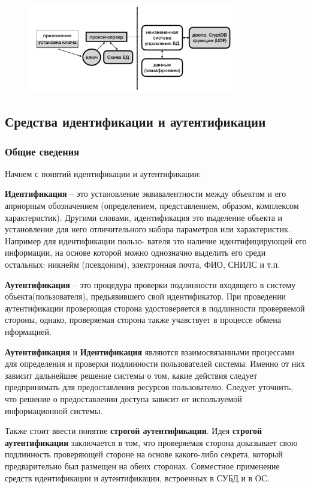 \begin{figure}[h]
    \centering
    \includegraphics[width=0.8\textwidth]{assets/CryptDB.png}
\end{figure}


\subsection{Средства идентификации и аутентификации}
\subsubsection{Общие сведения}
Начнем с понятий идентификации и аутентификации:

\textbf{Идентификация} – это установление эквивалентности между объектом и его априорным
обозначением (определением, представлением, образом, комплексом характеристик). Другими словами,
идентификация это выделение обьекта и установление для него отличительного набора параметров или
характеристик. Например для идентификации пользо- вателя это наличие идентифицирующей его
информации, на основе которой можно однозначно выделить его среди остальных: никнейм (псевдоним),
электронная почта, ФИО, СНИЛС и т.п.

\textbf{Аутентификация} – это процедура проверки подлинности входящего в систему обьекта(пользователя),
предьявившего свой идентификатор. При проведении аутентификации проверющая сторона удостоверяется в подлинности
проверяемой стороны, однако, проверяемая сторона также учавствует в процессе обмена нформацией.

\textbf{Аутентификация} и \textbf{Идентификация} являются взаимосвязанными процессами для определения и проверки
подлинности пользователей системы. Именно от них зависит дальнейшее решение системы о том, какие
действия следует предпринимать для предоставления ресурсов пользователю. Следует уточнить, что
решение о предоставлении доступа зависит от используемой информационной системы.

Также стоит ввести понятие \textbf{строгой аутентификации}. Идея \textbf{строгой аутентификации}
заключается в том, что проверяемая сторона доказывает свою подлинность проверяющей стороне на
основе какого-либо секрета, который предварительно был размещен на обеих сторонах. Совместное
применение средств идентификации и аутентификации, встроенных в СУБД и в ОС.

